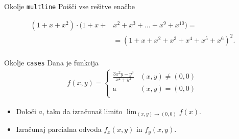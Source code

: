 \begin{frame}{Okolje \texttt{multline}}
	Poišči vse rešitve enačbe
	
	\begin{align*}
		(1+x+x^2) \cdot (1+x+&x^2+x^3+\ldots+x^9+x^{10}) = \\
		&=(1+x+x^2+x^3+x^4+x^5+x^6)^2.\\
	\end{align*}
\end{frame}
\begin{frame}{Okolje \texttt{cases}}
	Dana je funkcija
		\begin{align*}
			f(x,y)=
			\begin{cases}\frac{3x^2y-y^3}{x^2+y^2}&\text{$(x,y)\neq(0,0)$}\\
			\text{a}&\text{$(x,y)= (0,0)$}\\
			\end{cases} 
		\end{align*}
	\begin{itemize}
		\item Določi $a$, tako da izračunaš limito \( \lim_{(x,y)\to(0,0)} f(x). \)
		\item Izračunaj parcialna odvoda $f_x(x,y)$ in $f_y(x,y)$.
	\end{itemize}
\end{frame}